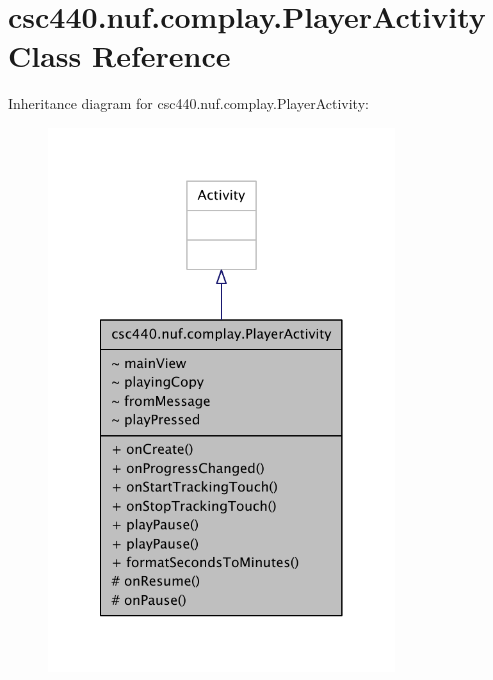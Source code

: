 \hypertarget{classcsc440_1_1nuf_1_1complay_1_1_player_activity}{\section{csc440.\-nuf.\-complay.\-Player\-Activity Class Reference}
\label{classcsc440_1_1nuf_1_1complay_1_1_player_activity}
}


Inheritance diagram for csc440.\-nuf.\-complay.\-Player\-Activity\-:
\nopagebreak
\begin{figure}[H]
\begin{center}
\leavevmode
\includegraphics[width=260pt]{classcsc440_1_1nuf_1_1complay_1_1_player_activity__inherit__graph}
\end{center}
\end{figure}


